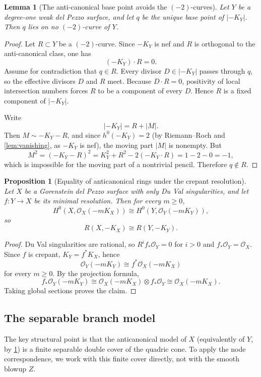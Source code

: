 \documentclass[11pt]{article}
\newtheorem{proposition}[proposition]{Proposition}
\newtheorem{lemma}[lemma]{Lemma}
\theoremstyle{definition}
\begin{document}
\begin{lemma}[The anti-canonical base point avoids the $(-2)$-curves]\label{lem:basepoint-avoids-minus2}
Let $Y$ be a degree-one weak del Pezzo surface, and let $q$ be the unique base point of $|-K_Y|$. Then $q$ lies on no $(-2)$-curve of $Y$.
\end{lemma}

\begin{proof}
Let $R\subset Y$ be a $(-2)$-curve. Since $-K_Y$ is nef and $R$ is orthogonal to the anti-canonical class, one has
\[
(-K_Y)\cdot R=0.
\]
Assume for contradiction that $q\in R$. Every divisor $D\in |-K_Y|$ passes through $q$, so the effective divisors $D$ and $R$ meet. Because $D\cdot R=0$, positivity of local intersection numbers forces $R$ to be a component of every $D$. Hence $R$ is a fixed component of $|-K_Y|$.

Write
\[
|-K_Y| = R + |M|.
\]
Then $M\sim -K_Y-R$, and since $h^0(-K_Y)=2$ (by Riemann--Roch and \cref{lem:vanishing}, as $-K_Y$ is nef), the moving part $|M|$ is nonempty. But
\[
M^2 = (-K_Y-R)^2 = K_Y^2 + R^2 - 2(-K_Y\cdot R)=1-2-0=-1,
\]
which is impossible for the moving part of a nontrivial pencil. Therefore $q\notin R$.
\end{proof}

\begin{proposition}[Equality of anticanonical rings under the crepant resolution]\label{prop:ring-equality}
Let $X$ be a Gorenstein del Pezzo surface with only Du Val singularities, and let $f\colon Y\to X$ be its minimal resolution. Then for every $m\ge 0$,
\[
H^0(X,\mathcal O_X(-mK_X))\cong H^0(Y,\mathcal O_Y(-mK_Y)),
\]
so
\[
R(X,-K_X)\cong R(Y,-K_Y).
\]
\end{proposition}

\begin{proof}
Du Val singularities are rational, so $R^if_*\mathcal O_Y=0$ for $i>0$ and $f_*\mathcal O_Y=\mathcal O_X$. Since $f$ is crepant, $K_Y=f^*K_X$, hence
\[
\mathcal O_Y(-mK_Y)\cong f^*\mathcal O_X(-mK_X)
\]
for every $m\ge 0$. By the projection formula,
\[
f_*\mathcal O_Y(-mK_Y)\cong \mathcal O_X(-mK_X)\otimes f_*\mathcal O_Y\cong \mathcal O_X(-mK_X).
\]
Taking global sections proves the claim.
\end{proof}

\subsection{The separable branch model}

The key structural point is that the anticanonical model of $X$ (equivalently of $Y$, by \cref{prop:ring-equality}) is a finite separable double cover of the quadric cone. To apply the node correspondence, we work with this finite cover directly, not with the smooth blowup $Z$.
\end{document}
